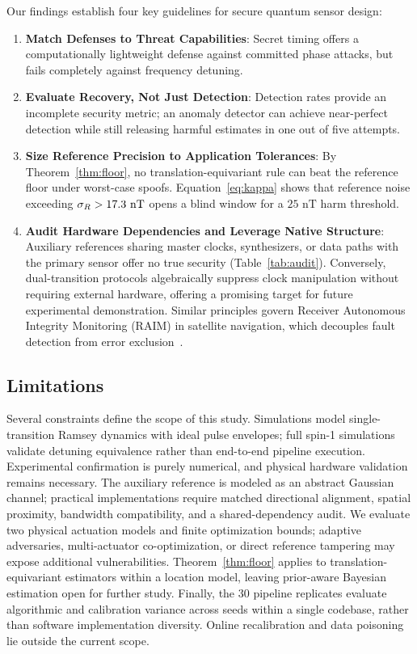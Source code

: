 \documentclass[conference]{IEEEtran}
\begin{document}
Our findings establish four key guidelines for secure quantum sensor design:
\begin{enumerate}
\item \textbf{Match Defenses to Threat Capabilities}: Secret timing offers a computationally lightweight defense against committed phase attacks, but fails completely against frequency detuning.
\item \textbf{Evaluate Recovery, Not Just Detection}: Detection rates provide an incomplete security metric; an anomaly detector can achieve near-perfect detection while still releasing harmful estimates in one out of five attempts.
\item \textbf{Size Reference Precision to Application Tolerances}: By Theorem~\ref{thm:floor}, no translation-equivariant rule can beat the reference floor under worst-case spoofs. Equation~\eqref{eq:kappa} shows that reference noise exceeding $\sigma_R > 17.3\text{~nT}$ opens a blind window for a $25\text{~nT}$ harm threshold.
\item \textbf{Audit Hardware Dependencies and Leverage Native Structure}: Auxiliary references sharing master clocks, synthesizers, or data paths with the primary sensor offer no true security (Table~\ref{tab:audit}). Conversely, dual-transition protocols algebraically suppress clock manipulation without requiring external hardware, offering a promising target for future experimental demonstration. Similar principles govern Receiver Autonomous Integrity Monitoring (RAIM) in satellite navigation, which decouples fault detection from error exclusion~\cite{brown1992raim,psiaki2016gnss}.
\end{enumerate}

\subsection{Limitations}
\label{sec:limits}

Several constraints define the scope of this study. Simulations model single-transition Ramsey dynamics with ideal pulse envelopes; full spin-1 simulations validate detuning equivalence rather than end-to-end pipeline execution. Experimental confirmation is purely numerical, and physical hardware validation remains necessary. The auxiliary reference is modeled as an abstract Gaussian channel; practical implementations require matched directional alignment, spatial proximity, bandwidth compatibility, and a shared-dependency audit. We evaluate two physical actuation models and finite optimization bounds; adaptive adversaries, multi-actuator co-optimization, or direct reference tampering may expose additional vulnerabilities. Theorem~\ref{thm:floor} applies to translation-equivariant estimators within a location model, leaving prior-aware Bayesian estimation open for further study. Finally, the 30 pipeline replicates evaluate algorithmic and calibration variance across seeds within a single codebase, rather than software implementation diversity. Online recalibration and data poisoning lie outside the current scope.
\end{document}
